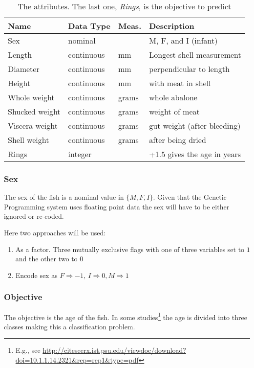 \documentclass[a4paper,twoside]{article}
\begin{document}
\begin{enumerate}
\begin{table}[h]
  \begin{tabular}{llll}
    Name & Data Type & Meas. & Description\\
    \hline
    Sex &  nominal & &  M, F, and I (infant)\\
    Length & continuous & mm &  Longest shell measurement\\
    Diameter & continuous & mm &  perpendicular to length\\
    Height & continuous & mm &  with meat in shell\\
    Whole weight & continuous & grams & whole abalone\\
    Shucked weight & continuous & grams & weight of meat\\
    Viscera weight & continuous & grams & gut weight (after bleeding)\\
    Shell weight & continuous & grams & after being dried\\
    Rings & integer && +1.5 gives the age in years\\
  \end{tabular}
  \label{tab:abalone.parameters}
  \caption{The attributes.  The last one, \emph{Rings}, is the
    objective to predict }
\end{table}

\subsubsection{Sex}

The sex of the fish is a nominal value in $\{M, F, I\}$.  Given
that the Genetic Programming system uses floating point data the
sex will have to be either ignored or re-coded.

Here two approaches will be used:
\begin{enumerate}
\item As a factor.  Three mutually exclusive flags with one of
  three variables set to $1$ and the other two to $0$
\item Encode sex as $F\Rightarrow-1,\ I\Rightarrow0, M\Rightarrow1$
\end{enumerate}


\subsubsection{Objective}

The objective is the age of the fish.  In some
studies\footnote{E.g., see
  \url{http://citeseerx.ist.psu.edu/viewdoc/download?doi=10.1.1.14.2321&rep=rep1&type=pdf}}
the age is divided into three classes making this a classification
problem.


\end{enumerate}
\end{document}

